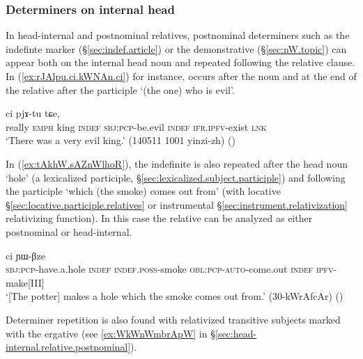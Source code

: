 \subsubsection{Determiners on internal head} \label{sec:head-internal.relative.determiners}
In head-internal and postnominal relatives, postnominal determiners such as the indefinte marker  (§\ref{sec:indef.article}) or the demonstrative  (§\ref{sec:nW.topic}) can appear both on the internal head noun and repeated following the relative clause. In (\ref{ex:rJAlpu.ci.kWNAn.ci}) for instance,  occurs after the noun   and at the end of the relative after the participle  `(the one) who is evil'. 

\begin{exe}
\ex \label{ex:rJAlpu.ci.kWNAn.ci}
 ci pjɤ-tu tɕe, \\
really \textsc{emph} king \textsc{indef} \textsc{sbj}:\textsc{pcp}-be.evil \textsc{indef} \textsc{ifr}.\textsc{ipfv}-exist \textsc{lnk} \\
\glt `There was a very evil king.' (140511 1001 yinzi-zh)
()
 \end{exe} 

In (\ref{ex:tAkhW.sAZnWlhoR}), the indefinite  is also repeated after the head noun  `hole' (a lexicalized participle, §\ref{sec:lexicalized.subject.participle}) and following the participle  `which (the smoke) comes out from' (with locative §\ref{sec:locative.participle.relatives} or instrumental §\ref{sec:instrument.relativization} relativizing function). In this case the relative can be analyzed as either postnominal or head-internal.

\begin{exe}
\ex \label{ex:tAkhW.sAZnWlhoR}
 ci ɲɯ-βze \\
\textsc{sbj}:\textsc{pcp}-have.a.hole \textsc{indef} \textsc{indef}.\textsc{poss}-smoke \textsc{obl}:\textsc{pcp}-\textsc{auto}-come.out \textsc{indef} \textsc{ipfv}-make[III] \\ 
\glt `[The potter] makes a hole which the smoke comes out from.' (30-kWrAfcAr)
()
\end{exe}

Determiner repetition is also found with relativized transitive subjects marked with the ergative (see \ref{ex:WkWnWmbrApW} in §\ref{sec:head-internal.relative.postnominal}).

